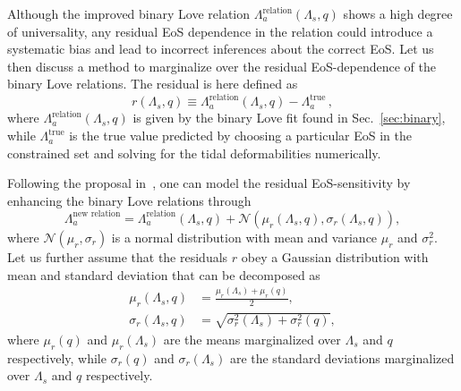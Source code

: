\documentclass[prd,twocolumn,nofootinbib,superscriptaddress,amsmath,amssymb]{revtex4-1}
\begin{document}
Although the improved binary Love relation $\Lambda_a^{\text{relation}}(\Lambda_s,q)$ shows a high degree of universality, any residual EoS dependence in the relation could introduce a systematic bias and lead to incorrect inferences about the correct EoS. Let us then discuss a method to marginalize over the residual EoS-dependence of the binary Love relations. The residual is here defined as 
\begin{equation}
\label{eq:residual}
r(\Lambda_{s},q) \equiv \Lambda_a^{\text{relation}}(\Lambda_s,q)-\Lambda_a^{\text{true}}\,,
\end{equation}
where $\Lambda_a^{\text{relation}}(\Lambda_s,q)$ is given by the binary Love fit found in Sec.~\ref{sec:binary}, while $\Lambda_a^{\text{true}}$ is the true value predicted by choosing a particular EoS in the constrained set and solving for the tidal deformabilities numerically. 

Following the proposal in~\cite{Katerina:residuals}, one can model the residual EoS-sensitivity by enhancing the binary Love relations through 
\begin{equation}
\Lambda_a^{{\textrm{new relation}}}=\Lambda_a^{\text{relation}}(\Lambda_s,q)+\mathcal{N}(\mu_{r}(\Lambda_s,q),\sigma_{r}(\Lambda_s,q)),
\end{equation}
where $\mathcal{N}(\mu_r,\sigma_r)$ is a normal distribution with mean and variance $\mu_{r}$ and $\sigma_{r}^2$. Let us further assume that the residuals $r$ obey a Gaussian distribution with mean and standard deviation that can be decomposed as
\begin{align}
\mu_{r}(\Lambda_s,q) &=\frac{\mu_{r}(\Lambda_s)+\mu_{r}(q)}{2},\\ 
\sigma_{r}(\Lambda_s,q) &=\sqrt{\sigma_{r}^2(\Lambda_s) + \sigma_{r}^2(q)},
\end{align}
where $\mu_{r}(q)$ and $\mu_{r}(\Lambda_{s})$ are the means marginalized over $\Lambda_{s}$ and $q$ respectively, while $\sigma_{r}(q)$ and $\sigma_{r}(\Lambda_{s})$ are the standard deviations marginalized over $\Lambda_{s}$ and $q$ respectively.
\end{document}
